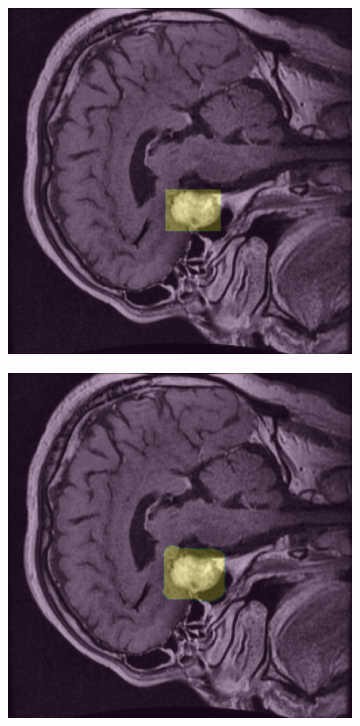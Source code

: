 \begin{figure}[H]
    \begin{subfigure}{0.45\textwidth}
        \includegraphics[width=\linewidth]{chapters/segmentacion/images/3.png}
       \caption*{}
    \end{subfigure}
    \hfill
    \begin{subfigure}{0.45\textwidth}
        \includegraphics[width=\linewidth]{chapters/segmentacion/images/4.png}
        \caption*{}
    \end{subfigure}
    \medskip
    

\end{figure}
